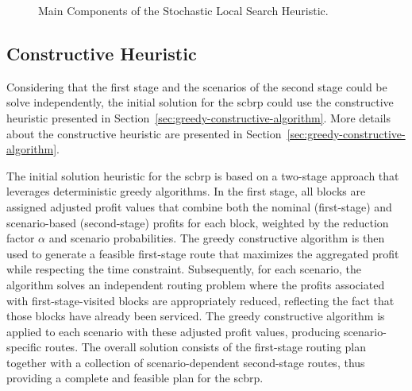 \begin{figure}[h!]
	\caption{Main Components of the Stochastic Local Search Heuristic.}
	\label{fig:stochastic-local-search-heuristic}
\end{figure}

\subsection{Constructive Heuristic}

Considering that the first stage and the scenarios of the second stage could be solve independently, the initial solution for the \gls{scbrp} could use the constructive heuristic presented in Section~\ref{sec:greedy-constructive-algorithm}. More details about the constructive heuristic are presented in Section~\ref{sec:greedy-constructive-algorithm}.

The initial solution heuristic for the \gls{scbrp} is based on a two-stage approach that leverages deterministic greedy algorithms. In the first stage, all blocks are assigned adjusted profit values that combine both the nominal (first-stage) and scenario-based (second-stage) profits for each block, weighted by the reduction factor $\alpha$ and scenario probabilities. The greedy constructive algorithm is then used to generate a feasible first-stage route that maximizes the aggregated profit while respecting the time constraint. Subsequently, for each scenario, the algorithm solves an independent routing problem where the profits associated with first-stage-visited blocks are appropriately reduced, reflecting the fact that those blocks have already been serviced. The greedy constructive algorithm is applied to each scenario with these adjusted profit values, producing scenario-specific routes. The overall solution consists of the first-stage routing plan together with a collection of scenario-dependent second-stage routes, thus providing a complete and feasible plan for the \gls{scbrp}.

